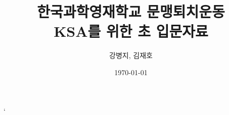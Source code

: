\documentclass{oblivoir}
\author{강병지, 김재호}
\date{\today}
\title{한국과학영재학교 문맹퇴치운동 \\
  \large KSA를 위한 \lt 초 입문자료}
\begin{document}
\maketitle
\tableofcontents




`

\end{document}
